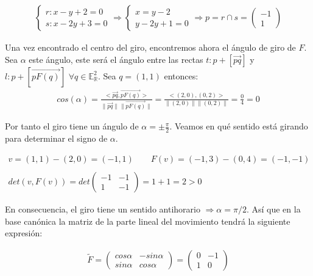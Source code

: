 \begin{gather*}
    \begin{cases}
    r: x-y+2=0\\
    s: x-2y+3=0
    \end{cases}
    \Longrightarrow
    \begin{cases}
    x = y-2\\ y -2y + 1 = 0
    \end{cases}
    \Longrightarrow
    p = r \cap s =
    \begin{pmatrix}
    -1\\1
    \end{pmatrix}
\end{gather*}

Una vez encontrado el centro del giro, encontremos ahora el ángulo de giro de $F$. Sea $\alpha$ este ángulo, este será el ángulo entre las rectas $t: p + [\Vec{pq}]$ y $l: p + [\Vec{pF(q)}]$  $\forall q \in \mathbb{E}^{2}_{\mathbb{R}}$. Sea $q = (1,1)$ entonces:
\begin{gather*}
    cos(\alpha) = \frac{<\Vec{pq},\Vec{pF(q)}>}{\| \Vec{pq}\| \| \Vec{pF(q)} \|} = \frac{<(2,0),(0,2)>}{\|(2,0)\| \|(0,2)\|} = \frac{0}{4} = 0
\end{gather*}

Por tanto el giro tiene un ángulo de $\alpha = \pm \frac{\pi}{2}$. Veamos en qué sentido está girando para determinar el signo de $\alpha$.

\begin{gather*}
    v = (1,1) - (2,0) = (-1,1) \quad \quad F(v) = (-1,3)-(0,4) = (-1,-1)\\
    \\
    det(v,F(v)) = det
    \begin{pmatrix}
    -1 & -1\\ 1 & -1
    \end{pmatrix}
    = 1 +1 = 2 > 0
\end{gather*}

En consecuencia, el giro tiene un sentido antihorario $\Longrightarrow \alpha = \pi/2$. Así que en la base canónica la matriz de la parte lineal del movimiento tendrá la siguiente expresión:

\begin{gather*}
    \widetilde{F} = 
    \begin{pmatrix}
    cos\alpha & -sin\alpha\\
    sin\alpha & cos\alpha
    \end{pmatrix}
    =
    \begin{pmatrix}
    0 & -1\\
    1 & 0
    \end{pmatrix}
\end{gather*}

